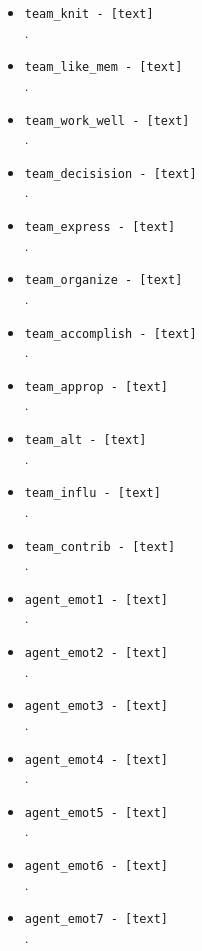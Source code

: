 \begin{description}
\begin{addmargin}[0em]{0em}
\begin{addmargin}[1em]{0em}
\begin{itemize}
            \item \verb|team_knit - [text]|\\.
            \item \verb|team_like_mem - [text]|\\.
            \item \verb|team_work_well - [text]|\\.
            \item \verb|team_decisision - [text]|\\.
            \item \verb|team_express - [text]|\\.
            \item \verb|team_organize - [text]|\\.
            \item \verb|team_accomplish - [text]|\\.
            \item \verb|team_approp - [text]|\\.
            \item \verb|team_alt - [text]|\\.
            \item \verb|team_influ - [text]|\\.
            \item \verb|team_contrib - [text]|\\.
            \item \verb|agent_emot1 - [text]|\\.
            \item \verb|agent_emot2 - [text]|\\.
            \item \verb|agent_emot3 - [text]|\\.
            \item \verb|agent_emot4 - [text]|\\.
            \item \verb|agent_emot5 - [text]|\\.
            \item \verb|agent_emot6 - [text]|\\.
            \item \verb|agent_emot7 - [text]|\\.

\end{itemize}
\end{addmargin}
\end{addmargin}
\end{description}
